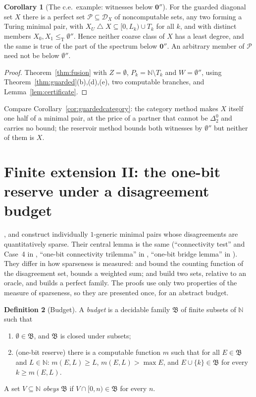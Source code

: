 \documentclass[11pt,letterpaper]{article}
\theoremstyle{definition}
\newtheorem{definition}{Definition}[section]
\newtheorem{corollary}[definition]{Corollary}
\numberwithin{equation}{section}
\newcommand{\N}{\mathbb N}
\newcommand{\leT}{\le_{\mathrm T}}
\newcommand{\DX}[1]{\mathcal D_{#1}}
\newcommand{\sd}{\mathbin{\triangle}}
\newcommand{\zero}{\mathbf 0}
\newcommand{\bud}{\mathfrak B}
\newcommand{\src}[1]{\leavevmode{\sffamily\footnotesize\color{Steel}[#1]}}
\newcommand{\rep}[1]{\leavevmode{\sffamily\small\color{Steel}R#1}}
\begin{document}
\begin{corollary}[The c.e.\ example: witnesses below $\zero''$]\label{cor:cefusion}\src{R5}
For the guarded diagonal set $X$ there is a perfect set $\mathcal P\subseteq\DX X$ of noncomputable sets, any two forming a Turing minimal pair, with $X_U\sd X\subseteq[0,L_k)\cup T_k$ for all $k$, and with distinct members $X_0,X_1\leT\emptyset''$. Hence neither coarse class of $X$ has a least degree, and the same is true of the part of the spectrum below $\zero''$. An arbitrary member of $\mathcal P$ need not be below $\emptyset''$.
\end{corollary}
\begin{proof}
Theorem~\ref{thm:fusion} with $Z=\emptyset$, $P_k=\N\setminus T_k$ and $W=\emptyset''$, using Theorem~\ref{thm:guarded}(b),(d),(e), two computable branches, and Lemma~\ref{lem:certificate}.
\end{proof}
Compare Corollary~\ref{cor:guardedcategory}: the category method makes $X$ itself one half of a minimal pair, at the price of a partner that cannot be $\Delta^0_2$ and carries no bound; the reservoir method bounds both witnesses by $\emptyset''$ but neither of them is $X$.

\section{Finite extension II: the one-bit reserve under a disagreement budget}\label{sec:budget}
\rep2, \rep6 and \rep7 construct individually $1$-generic minimal pairs whose disagreements are quantitatively sparse. Their central lemma is the same (``connectivity test'' and Case~4 in \rep2, ``one-bit connectivity trilemma'' in \rep6, ``one-bit bridge lemma'' in \rep7). They differ in how sparseness is measured: \rep2 and \rep6 bound the counting function of the disagreement set, \rep7 bounds a weighted sum; \rep2 and \rep7 build two sets, relative to an oracle, and \rep6 builds a perfect family. The proofs use only two properties of the measure of sparseness, so they are presented once, for an abstract budget.

\begin{definition}[Budget]\label{def:budget}
A \emph{budget} is a decidable family $\bud$ of finite subsets of $\N$ such that
\begin{enumerate}[label=\textup{(B\arabic*)},leftmargin=2.6em]
\item $\emptyset\in\bud$, and $\bud$ is closed under subsets;
\item \textup{(one-bit reserve)} there is a computable function $m$ such that for all $E\in\bud$ and $L\in\N$: $m(E,L)\ge L$, $m(E,L)>\max E$, and $E\cup\{k\}\in\bud$ for every $k\ge m(E,L)$.
\end{enumerate}
A set $V\subseteq\N$ \emph{obeys} $\bud$ if $V\cap[0,n)\in\bud$ for every $n$.
\end{definition}
\end{document}
